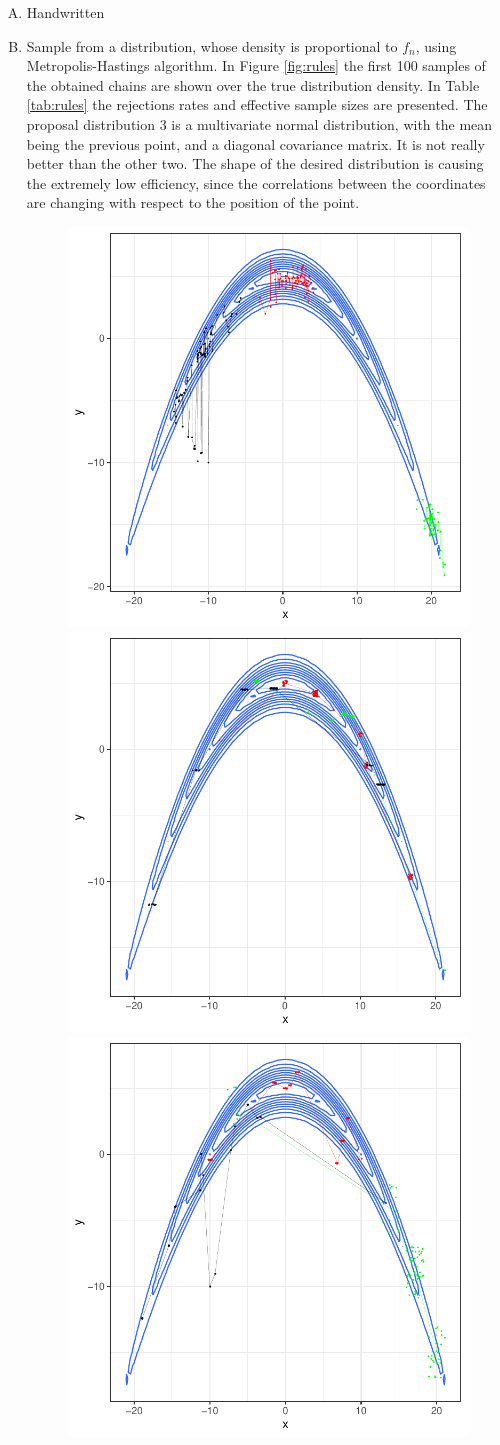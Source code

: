 \documentclass[12pt]{article}
\begin{document}
\begin{enumerate}[A)]
\begin{enumerate}[1.]
            \item Metropolis-Hastings with a $U(x_i - \delta, x_i + \delta), ~ \delta > 0 $ distribution. The rejection rate monotonically increases with $\delta$ increasing. The variance of the estimator tends toward 0 for $\delta$ approaching 0 and for $\delta >> 0$, with a peak around $delta \in [3, ~ 7]$. For $\delta = 5$ the estimation is $I = 0.168$ with variance 0.985 (much bigger than in (2)). The effective sample size is only 29 (this is the main cause of the increased variance).
        \end{enumerate}
    
    \item Handwritten
    \item Sample from a distribution, whose density is proportional to $f_n$, using Metropolis-Hastings algorithm. In Figure \ref{fig:rules} the first 100 samples of the obtained chains are shown over the true distribution density. In Table \ref{tab:rules} the rejections rates and effective sample sizes are presented. The proposal distribution 3 is a multivariate normal distribution, with the mean being the previous point, and a diagonal covariance matrix. It is not really better than the other two. The shape of the desired distribution is causing the extremely low efficiency, since the correlations between the coordinates are changing with respect to the position of the point.
        \begin{figure}
            \centering
            \includegraphics[width=.3\textwidth]{rule1.pdf}
            \hfill
            \includegraphics[width=.3\textwidth]{rule2.pdf}
            \hfill    
            \includegraphics[width=.3\textwidth]{rule3.pdf}

\end{figure}
\end{enumerate}
\end{document}
